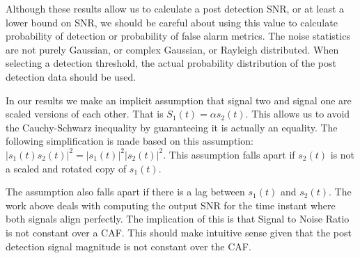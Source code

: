 \documentclass[11pt]{article}
\begin{document}
Although these results allow us to calculate a post detection SNR, or at least a lower bound on SNR, we should be careful about using this value to calculate probability of detection or probability of false alarm metrics. The noise statistics are not purely Gaussian, or complex Gaussian, or Rayleigh distributed. When selecting a detection threshold, the actual probability distribution of the post detection data should be used.

In our results we make an implicit assumption that signal two and signal one are scaled versions of each other. That is $S_1(t) = \alpha s_2(t)$. This allows us to avoid the Cauchy-Schwarz inequality by guaranteeing it is actually an equality. The following simplification is made based on this assumption: $|s_1(t)s_2(t)|^2 = |s_1(t)|^2|s_2(t)|^2$. This assumption falls apart if $s_2(t)$ is not a scaled and rotated copy of $s_1(t)$.

The assumption also falls apart if there is a lag between $s_1(t)$ and $s_2(t)$. The work above deals with computing the output SNR for the time instant where both signals align perfectly. The implication of this is that Signal to Noise Ratio is not constant over a CAF. This should make intuitive sense given that the post detection signal magnitude is not constant over the CAF.

\end{document}
